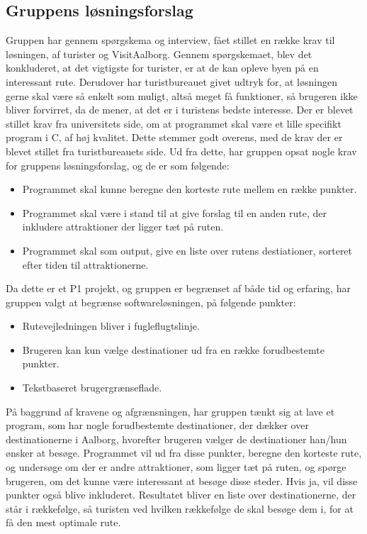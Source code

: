 \subsection{Gruppens løsningsforslag}
Gruppen har gennem spørgskema og interview, fået stillet en række krav til løsningen, af turister og VisitAalborg. 
Gennem spørgskemaet, blev det konkluderet, at det vigtigste for turister, er at de kan opleve byen på en interessant rute. 
Derudover har turistbureauet givet udtryk for, at løsningen gerne skal være så enkelt som muligt, altså meget få funktioner, så brugeren ikke bliver forvirret, da de mener, at det er i turistens bedste interesse. \newline
Der er blevet stillet krav fra universitets side, om at programmet skal være et lille specifikt program i C, af høj kvalitet. Dette stemmer godt overens, med de krav der er blevet stillet fra turistbureauets side.   \newline
Ud fra dette, har gruppen opsat nogle krav for gruppens løsningsforslag, og de er som følgende:
\begin{itemize}
	\item Programmet skal kunne beregne den korteste rute mellem en række punkter.
	\item Programmet skal være i stand til at give forslag til en anden rute, der inkludere attraktioner der ligger tæt på ruten.
 	\item Programmet skal som output, give en liste over rutens destiationer, sorteret efter tiden til attraktionerne.
\end{itemize}

Da dette er et P1 projekt, og gruppen er begrænset af både tid og erfaring, har gruppen valgt at begrænse softwareløsningen, på følgende punkter: 
\begin{itemize}
	\item Rutevejledningen bliver i fugleflugtslinje.
	\item Brugeren kan kun vælge destinationer ud fra en række forudbestemte punkter.
	\item Tekstbaseret brugergrænseflade.
\end{itemize}

På baggrund af kravene og afgrænsningen, har gruppen tænkt sig at lave et program, som har nogle forudbestemte destinationer, der dækker over destinationerne i Aalborg, hvorefter brugeren vælger de destinationer han/hun ønsker at besøge. Programmet vil ud fra disse punkter, beregne den korteste rute, og undersøge om der er andre attraktioner, som ligger tæt på ruten, og spørge brugeren, om det kunne være interessant at besøge disse steder. Hvis ja, vil disse punkter også blive inkluderet. Resultatet bliver en liste over destinationerne, der står i rækkefølge, så turisten ved hvilken rækkefølge de skal besøge dem i, for at få den mest optimale rute.

